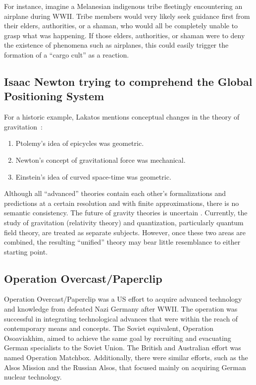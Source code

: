 For instance, imagine a Melanesian indigenous tribe fleetingly encountering an airplane during WWII.
Tribe members would very likely seek guidance first from their elders, authorities, or a shaman,
who would all be completely unable to grasp what was happening.
If those elders, authorities, or shaman were to deny the existence of phenomena such as airplanes,
this could easily trigger the formation of a ``cargo cult'' as a reaction.

\subsection{Isaac Newton trying to comprehend the Global Positioning System}

For a historic example,
Lakatos mentions conceptual changes in the theory of gravitation~\cite{lakatosch}:
\begin{enumerate}
\item
Ptolemy's idea of epicycles was geometric.
\item
Newton's concept of gravitational force was mechanical.
\item
Einstein's idea of curved space-time was geometric.
\end{enumerate}
Although all ``advanced'' theories contain each other's formalizations and predictions at a certain resolution and with finite approximations, there is no semantic consistency. The future of gravity theories is uncertain \cite{isqg-cc, isqg}.
Currently, the study of gravitation (relativity theory) and quantization, particularly quantum field theory, are treated as separate subjects. However, once these two areas are combined, the resulting ``unified'' theory may bear little resemblance to either starting point.

\subsection{Operation Overcast/Paperclip}

Operation Overcast/Paperclip was a US effort to acquire advanced technology and knowledge from defeated Nazi Germany after WWII.
The operation was successful in integrating technological advances that were within the reach of contemporary means and concepts. The Soviet equivalent, Operation Osoaviakhim, aimed to achieve the same goal by recruiting and evacuating German specialists to the Soviet Union. The British and Australian effort was named Operation Matchbox. Additionally, there were similar efforts, such as the Alsos Mission and the Russian Alsos, that focused mainly on acquiring German nuclear technology.

